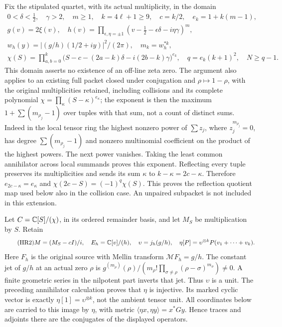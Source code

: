 \documentclass[11pt]{article}
\begin{document}
Fix the stipulated quartet, with its actual multiplicity, in the domain
\begin{equation}\tag{HR1}\label{hrv:HR1}
\begin{gathered}
0<\delta<\tfrac12,\quad\gamma>2,\quad m\ge1,\quad
k=4\ell+1\ge9,\quad c=k/2,\quad e_k=1+k(m-1),\\
g(v)=2\xi(v),\quad h(v)=\prod_{\epsilon,\eta=\pm1}
(v-\tfrac12-\epsilon\delta-i\eta\gamma)^m,\\
w_h(y)=|(g/h)(1/2+iy)|^2/(2\pi),\quad m_k=w_h^{*k},\\
\chi(S)=\prod_{a,b=0}^k
\bigl(S-c-(2a-k)\delta-i(2b-k)\gamma\bigr)^{e_k},\quad
q=e_k(k+1)^2,\quad N\ge q-1.
\end{gathered}
\end{equation}
This domain asserts no existence of an off-line zeta zero. The argument
also applies to an existing full packet closed under conjugation and
\(\rho\mapsto1-\rho\), with the original multiplicities retained,
including collisions and its complete polynomial
\(\chi=\prod_\kappa(S-\kappa)^{e_\kappa}\); the exponent is then the
maximum \(1+\sum(m_{\rho_j}-1)\) over tuples with that sum, not a count
of distinct sums. Indeed in the local tensor ring the highest nonzero
power of \(\sum z_j\), where \(z_j^{m_{\rho_j}}=0\), has degree
\(\sum(m_{\rho_j}-1)\) and nonzero multinomial coefficient on the
product of the highest powers. The next power vanishes. Taking the
least common annihilator across local summands proves this exponent.
Reflecting every tuple preserves its multiplicities and sends its sum
\(\kappa\) to \(k-\kappa=2c-\kappa\). Therefore
\(e_{2c-\kappa}=e_\kappa\) and
\(\chi(2c-S)=(-1)^q\chi(S)\). This proves the reflection quotient
map used below also in the collision case. An unpaired subpacket is
not included in this extension.

Let \(C=\mathbb C[S]/(\chi)\), in its ordered remainder basis, and let
\(M_S\) be multiplication by \(S\). Retain
\begin{equation}\tag{HR2}\label{hrv:HR2}
M=(M_S-cI)/i,\quad E_h=\mathbb C[v]/(h),\quad
\upsilon=j_h(g/h),\quad
\eta[P]=\upsilon^{\otimes k}P(v_1+\cdots+v_k).
\end{equation}
Here \(F_h\) is the original source with Mellin transform
\(\mathcal M F_h=g/h\). The constant jet of \(g/h\) at an actual zero \(\rho\) is
\(g^{(m_\rho)}(\rho)/(m_\rho!\prod_{\sigma\ne\rho}
(\rho-\sigma)^{m_\sigma})\ne0\). A finite geometric series in the
nilpotent part inverts that jet. Thus \(\upsilon\) is a unit.
The preceding annihilator calculation proves that \(\eta\) is
injective. Its marked cyclic vector is exactly
\(\eta[1]=\upsilon^{\otimes k}\), not the ambient tensor unit.
All coordinates below are carried to this image by \(\eta\), with
metric \(\langle\eta x,\eta y\rangle=x^*Gy\). Hence traces and
adjoints there are the conjugates of the displayed operators.
\end{document}
